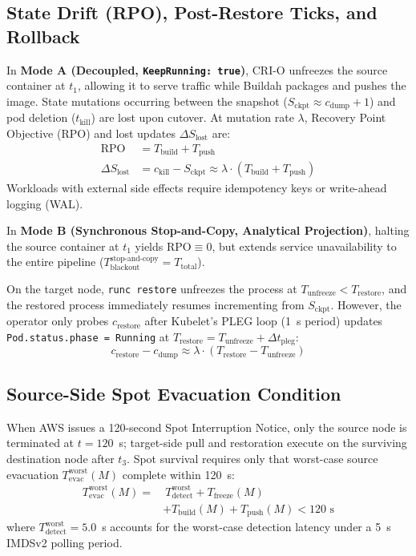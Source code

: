 \documentclass[conference,10pt]{IEEEtran}
\begin{document}
\subsection{State Drift (RPO), Post-Restore Ticks, and Rollback}
In \textbf{Mode A (Decoupled, \texttt{KeepRunning: true})}, CRI-O unfreezes the source container at $t_1$, allowing it to serve traffic while Buildah packages and pushes the image. State mutations occurring between the snapshot ($S_{\text{ckpt}} \approx c_{\text{dump}} + 1$) and pod deletion ($t_{\text{kill}}$) are lost upon cutover. At mutation rate $\lambda$, Recovery Point Objective (RPO) and lost updates $\Delta S_{\text{lost}}$ are:
\begin{align}
\text{RPO} &= T_{\text{build}} + T_{\text{push}} \\
\Delta S_{\text{lost}} &= c_{\text{kill}} - S_{\text{ckpt}} \approx \lambda \cdot (T_{\text{build}} + T_{\text{push}})
\label{eq:lost}
\end{align}
Workloads with external side effects require idempotency keys or write-ahead logging (WAL).

In \textbf{Mode B (Synchronous Stop-and-Copy, Analytical Projection)}, halting the source container at $t_1$ yields $\text{RPO} \equiv 0$, but extends service unavailability to the entire pipeline ($T_{\text{blackout}}^{\text{stop-and-copy}} = T_{\text{total}}$).

On the target node, \texttt{runc restore} unfreezes the process at $T_{\text{unfreeze}} < T_{\text{restore}}$, and the restored process immediately resumes incrementing from $S_{\text{ckpt}}$. However, the operator only probes $c_{\text{restore}}$ after Kubelet's PLEG loop (1~s period) updates \texttt{Pod.status.phase = Running} at $T_{\text{restore}} = T_{\text{unfreeze}} + \Delta t_{\text{pleg}}$:
\begin{equation}
c_{\text{restore}} - c_{\text{dump}} \approx \lambda \cdot (T_{\text{restore}} - T_{\text{unfreeze}})
\label{eq:post_restore}
\end{equation}

\subsection{Source-Side Spot Evacuation Condition}
When AWS issues a 120-second Spot Interruption Notice, only the source node is terminated at $t = 120$~s; target-side pull and restoration execute on the surviving destination node after $t_3$. Spot survival requires only that worst-case source evacuation $T_{\text{evac}}^{\text{worst}}(M)$ complete within 120~s:
\begin{align}
T_{\text{evac}}^{\text{worst}}(M) = &\ T_{\text{detect}}^{\text{worst}} + T_{\text{freeze}}(M) \nonumber \\
&+ T_{\text{build}}(M) + T_{\text{push}}(M) < 120\text{ s}
\label{eq:spot_evac}
\end{align}
where $T_{\text{detect}}^{\text{worst}} = 5.0$~s accounts for the worst-case detection latency under a 5~s IMDSv2 polling period.
\end{document}
